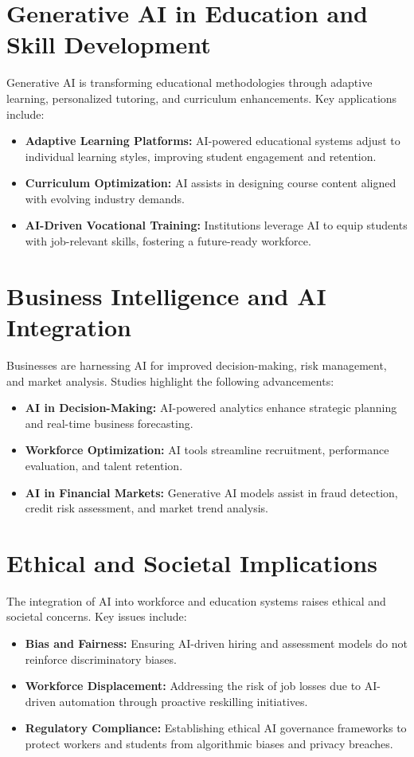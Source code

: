 \documentclass[a4paper,headinclude=on,footinclude=on,12pt,oneside]{scrbook}
\begin{document}
\section*{Generative AI in Education and Skill Development}

Generative AI is transforming educational methodologies through adaptive learning, personalized tutoring, and curriculum enhancements. Key applications include:
\begin{itemize}
	\item \textbf{Adaptive Learning Platforms:} AI-powered educational systems adjust to individual learning styles, improving student engagement and retention.
	\item \textbf{Curriculum Optimization:} AI assists in designing course content aligned with evolving industry demands.
	\item \textbf{AI-Driven Vocational Training:} Institutions leverage AI to equip students with job-relevant skills, fostering a future-ready workforce.
\end{itemize}

\section*{Business Intelligence and AI Integration}

Businesses are harnessing AI for improved decision-making, risk management, and market analysis. Studies highlight the following advancements:
\begin{itemize}
	\item \textbf{AI in Decision-Making:} AI-powered analytics enhance strategic planning and real-time business forecasting.
	\item \textbf{Workforce Optimization:} AI tools streamline recruitment, performance evaluation, and talent retention.
	\item \textbf{AI in Financial Markets:} Generative AI models assist in fraud detection, credit risk assessment, and market trend analysis.
\end{itemize}

\section*{Ethical and Societal Implications}

The integration of AI into workforce and education systems raises ethical and societal concerns. Key issues include:
\begin{itemize}
	\item \textbf{Bias and Fairness:} Ensuring AI-driven hiring and assessment models do not reinforce discriminatory biases.
	\item \textbf{Workforce Displacement:} Addressing the risk of job losses due to AI-driven automation through proactive reskilling initiatives.
	\item \textbf{Regulatory Compliance:} Establishing ethical AI governance frameworks to protect workers and students from algorithmic biases and privacy breaches.
\end{itemize}
\end{document}

